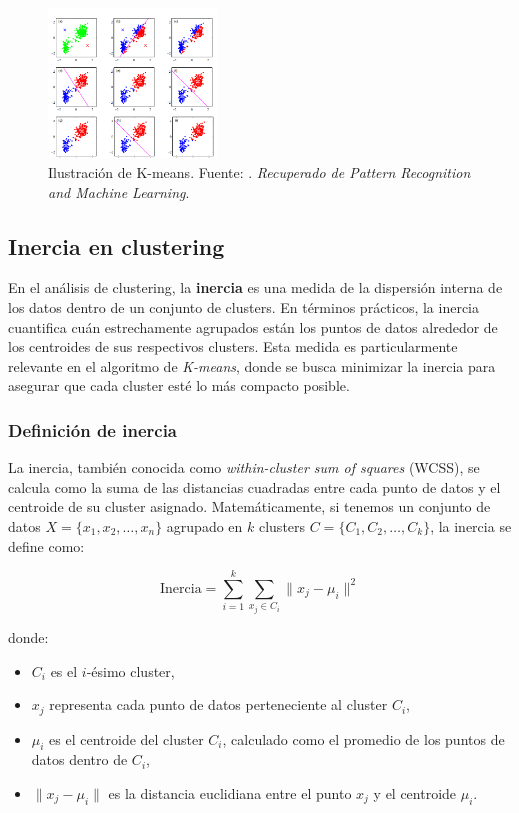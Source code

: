 \begin{figure}[H]
    \centering
    \includegraphics[width=0.40\textwidth]{2/figures/Kmeans.png}
    \caption{Ilustración de K-means. Fuente: \cite{bishop2006pattern}. \textit{Recuperado de Pattern Recognition and Machine Learning}.}
    \label{fig:kmeans}
\end{figure}


\subsection{Inercia en clustering}

En el análisis de clustering, la \textbf{inercia} es una medida de la dispersión interna de los datos dentro de un conjunto de clusters. En términos prácticos, la inercia cuantifica cuán estrechamente agrupados están los puntos de datos alrededor de los centroides de sus respectivos clusters. Esta medida es particularmente relevante en el algoritmo de \textit{K-means}, donde se busca minimizar la inercia para asegurar que cada cluster esté lo más compacto posible.

\subsubsection{Definición de inercia}

La inercia, también conocida como \textit{within-cluster sum of squares} (WCSS), se calcula como la suma de las distancias cuadradas entre cada punto de datos y el centroide de su cluster asignado. Matemáticamente, si tenemos un conjunto de datos \(X = \{x_1, x_2, \dots, x_n\}\) agrupado en \(k\) clusters \(C = \{C_1, C_2, \dots, C_k\}\), la inercia se define como:

\[
\text{Inercia} = \sum_{i=1}^{k} \sum_{x_j \in C_i} \| x_j - \mu_i \|^2
\]

donde:
\begin{itemize}
    \item \(C_i\) es el \(i\)-ésimo cluster,
    \item \(x_j\) representa cada punto de datos perteneciente al cluster \(C_i\),
    \item \(\mu_i\) es el centroide del cluster \(C_i\), calculado como el promedio de los puntos de datos dentro de \(C_i\),
    \item \(\| x_j - \mu_i \|\) es la distancia euclidiana entre el punto \(x_j\) y el centroide \(\mu_i\).
\end{itemize}

